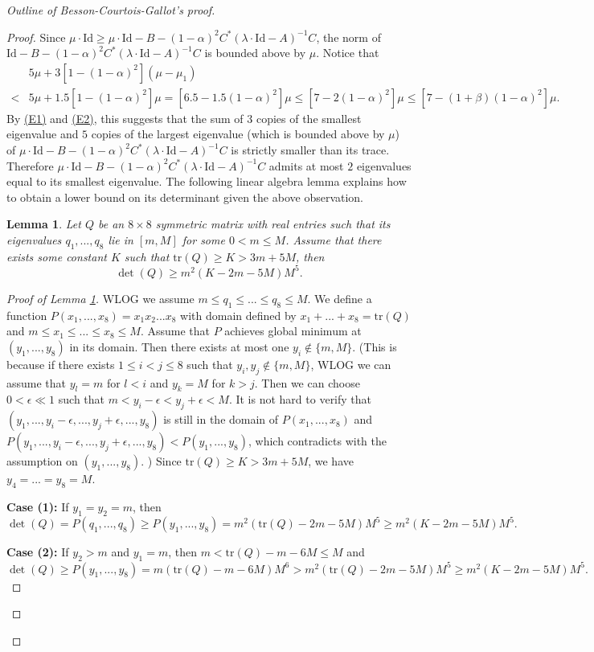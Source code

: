 \documentclass{article}
\newcommand{\id}{\mathrm{Id}}
\newcommand{\tr}{\mathrm{tr}}
\newtheorem{lem}[thm]{Lemma}
\theoremstyle{definition}
\begin{document}
\begin{proof}[Outline of Besson-Courtois-Gallot's proof]
\begin{proof}
Since $\mu\cdot\id\geq\mu\cdot\id-B-(1-\alpha)^2C^*(\lambda\cdot\id-A)^{-1}C$, the norm of $\id-B-(1-\alpha)^2C^*(\lambda\cdot\id-A)^{-1}C$ is bounded above by $\mu$. Notice that
\begin{align*}
&5\mu+3[1-(1-\alpha)^2](\mu-\mu_1)\\
<& 5\mu+1.5[1-(1-\alpha)^2]\mu =[6.5-1.5(1-\alpha)^2]\mu\leq [7-2(1-\alpha)^2]\mu\leq[7-(1+\beta)(1-\alpha)^2]\mu.
\end{align*}
By \hyperlink{E1}{(E1)} and \hyperlink{E2}{(E2)}, this suggests that the sum of $3$ copies of the smallest eigenvalue and $5$ copies of the largest eigenvalue (which is bounded above by $\mu$) of $\mu\cdot\id-B-(1-\alpha)^2C^*(\lambda\cdot\id-A)^{-1}C$ is strictly smaller than its trace. Therefore $\mu\cdot\id-B-(1-\alpha)^2C^*(\lambda\cdot\id-A)^{-1}C$ admits at most $2$ eigenvalues equal to its smallest eigenvalue. The following  linear algebra lemma explains how to obtain a lower bound on its determinant given the above observation.
\begin{lem}\label{reverse_AM_GM_ineq_1}
Let $Q$ be an $8\times 8$ symmetric matrix with real entries such that its eigenvalues $q_1,...,q_8$ lie in $[m,M]$ for some $0<m\leq M$. Assume that there exists some constant $K$ such that $\tr(Q)\geq K>3m+5M$, then
$$\det(Q)\geq m^2(K-2m-5M)M^5.$$
\end{lem}
\begin{proof}[Proof of Lemma \ref{reverse_AM_GM_ineq_1}]
WLOG we assume $m\leq q_1\leq...\leq q_8\leq M$. We define a function $P(x_1,...,x_8)=x_1x_2...x_8$ with domain defined by $x_1+...+x_8=\tr(Q)$ and $m\leq x_1\leq...\leq x_8\leq M$. Assume that $P$ achieves global minimum at $(y_1,...,y_8)$ in its domain. Then there exists at most one $y_i\not\in\{m,M\}$. (This is because if there exists $1\leq i<j\leq 8$ such that $y_i,y_j\not\in\{m,M\}$, WLOG we can assume that $y_l=m$ for $l<i$ and $y_k=M$ for $k>j$. Then we can choose $0<\epsilon\ll 1$ such that $m<y_i-\epsilon<y_j+\epsilon<M$. It is not hard to verify that $(y_1,...,y_i-\epsilon,...,y_j+\epsilon,...,y_8)$ is still in the domain of $P(x_1,...,x_8)$ and $P(y_1,...,y_i-\epsilon,...,y_j+\epsilon,...,y_8)<P(y_1,...,y_8)$, which contradicts with the assumption on $(y_1,...,y_8)$. ) Since $\tr(Q)\geq K>3m+5M$, we have $y_4=...=y_8=M$.

\textbf{Case (1):} If $y_1=y_2=m$, then 
$$\det(Q)=P(q_1,...,q_8)\geq P(y_1,...,y_8)=m^2(\tr(Q)-2m-5M)M^5\geq m^2(K-2m-5M)M^5.$$

\textbf{Case (2):} If $y_2>m$ and $y_1=m$, then $m< \tr(Q)-m-6M\leq M$ and
$$\det(Q)\geq P(y_1,...,y_8)=m(\tr(Q)-m-6M)M^6>m^2(\tr(Q)-2m-5M)M^5\geq m^2(K-2m-5M)M^5.$$


\end{proof}
\end{proof}
\end{proof}
\end{document}
